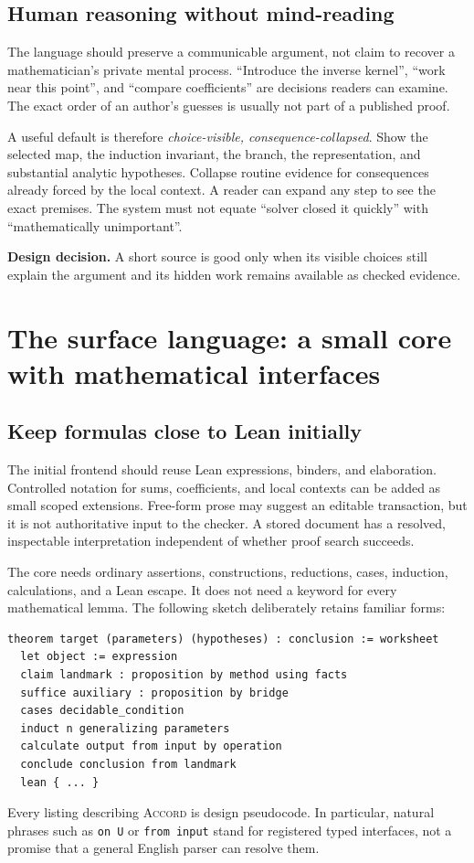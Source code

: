 \documentclass[11pt,a4paper]{article}
\newcommand{\code}[1]{\nolinkurl{#1}}
\newcommand{\Accord}{\textsc{Accord}}
\newcommand{\design}[1]{\par\smallskip\noindent\textbf{Design decision.} #1\par\smallskip}
\theoremstyle{definition}
\begin{document}
\subsection{Human reasoning without mind-reading}
The language should preserve a communicable argument, not claim to recover a
mathematician's private mental process. ``Introduce the inverse kernel'',
``work near this point'', and ``compare coefficients'' are decisions readers
can examine. The exact order of an author's guesses is usually not part of a
published proof.

A useful default is therefore \emph{choice-visible, consequence-collapsed}.
Show the selected map, the induction invariant, the branch, the representation,
and substantial analytic hypotheses. Collapse routine evidence for consequences
already forced by the local context. A reader can expand any step to see the
exact premises. The system must not equate ``solver closed it quickly'' with
``mathematically unimportant''.

\design{A short source is good only when its visible choices still explain the
argument and its hidden work remains available as checked evidence.}

\section{The surface language: a small core with mathematical interfaces}
\label{sec:surface}
\subsection{Keep formulas close to Lean initially}
The initial frontend should reuse Lean expressions, binders, and elaboration.
Controlled notation for sums, coefficients, and local contexts can be added as
small scoped extensions. Free-form prose may suggest an editable transaction,
but it is not authoritative input to the checker. A stored document has a
resolved, inspectable interpretation independent of whether proof search succeeds.

The core needs ordinary assertions, constructions, reductions, cases, induction,
calculations, and a Lean escape. It does not need a keyword for every mathematical
lemma. The following sketch deliberately retains familiar forms:
\par\noindent\begin{minipage}{\linewidth}
\begin{lstlisting}
theorem target (parameters) (hypotheses) : conclusion := worksheet
  let object := expression
  claim landmark : proposition by method using facts
  suffice auxiliary : proposition by bridge
  cases decidable_condition
  induct n generalizing parameters
  calculate output from input by operation
  conclude conclusion from landmark
  lean { ... }
\end{lstlisting}
\end{minipage}\par
Every listing describing \Accord{} is design pseudocode. In particular, natural
phrases such as \code{on U} or \code{from input} stand for registered typed
interfaces, not a promise that a general English parser can resolve them.
\end{document}
